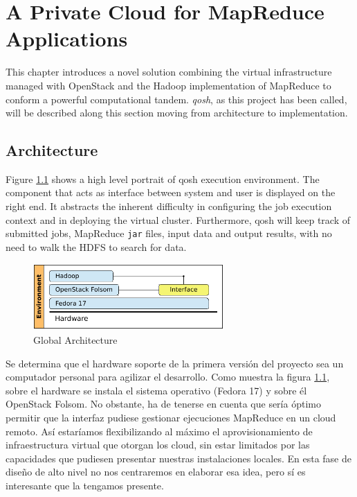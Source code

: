 \chapter{A Private Cloud for MapReduce Applications}\label{cap:solucion}
\noindent This chapter introduces a novel solution combining the virtual infrastructure managed with OpenStack and the Hadoop implementation of MapReduce to conform a powerful computational tandem. \emph{qosh}, as this project has been called, will be described along this section moving from architecture to implementation.

\section{Architecture}\label{sec:diseno}
\noindent Figure \ref{fig:arquitecturaglobal} shows a high level portrait of qosh execution environment. The component that acts as interface between system and user is displayed on the right end. It abstracts the inherent difficulty in configuring the job execution context and in deploying the virtual cluster. Furthermore, qosh will keep track of submitted jobs, MapReduce \texttt{jar} files, input data and output results, with no need to walk the HDFS to search for data.

\begin{figure}[tbp]
\begin{center}
\includegraphics[width=0.65\textwidth]{imagenes/021.pdf}
 \caption{Global Architecture}
\label{fig:arquitecturaglobal}
\end{center}
\end{figure}

Se determina que el hardware soporte de la primera versi\'on del proyecto sea un computador personal para agilizar el desarrollo. Como muestra la figura \ref{fig:arquitecturaglobal}, sobre el hardware se instala el sistema operativo (Fedora 17) y sobre \'el OpenStack Folsom. No obstante, ha de tenerse en cuenta que ser\'ia \'optimo permitir que la interfaz pudiese gestionar ejecuciones MapReduce en un cloud remoto. As\'i estar\'iamos flexibilizando al m\'aximo el aprovisionamiento de infraestructura virtual que otorgan los cloud, sin estar limitados por las capacidades que pudiesen presentar nuestras instalaciones locales. En esta fase de dise\~no de alto nivel no nos centraremos en elaborar esa idea, pero s\'i es interesante que la tengamos presente. \newline

